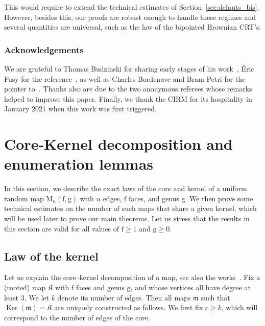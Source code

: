 \documentclass[JEP,XML,SOM,Unicode,NoFloatCountersInSection,NoEqCountersInSection]{cedram}
\theoremstyle{plain}
\theoremstyle{definition}
\theoremstyle{remark}
\newcommand{\map}{\mathfrak{m}}
\newcommand{\Map}{\mathrm{M}}
\newcommand{\face}{\mathrm{f}}
\newcommand{\gen}{\mathrm{g}}
\DeclareMathOperator{\Ker}{Ker}
\newcommand{\kernel}{\mathfrak{K}}
\begin{document}
This would require to extend the technical estimates of Section~\ref{sec:defauts_bis}. However, besides this, our proofs are robust enough to handle these regimes and several quantities are universal, such as the law of the bipointed Brownian CRT's.

\subsubsection*{Acknowledgements}
We are grateful to Thomas Budzinski for sharing early stages of his work~\cite{Bud21}, \'Eric Fusy for the reference~\cite{BCR93}, as well as Charles Bordenave and Bram Petri for the pointer to~\cite[Th.\,2.19]{Wor99}.
Thanks also are due to the two anonymous referees whose remarks helped to improve this paper.
Finally, we thank the CIRM for its hospitality in January 2021 when this work was first triggered.

\section{Core-Kernel decomposition and enumeration lemmas}
\label{sec:enumeration}

In this section, we describe the exact laws of the core and kernel of a uniform random map $ \Map_n(\face,\gen)$ with $n$ edges, $\face$ faces, and genus $\gen$. We then prove some technical estimates on the number of such maps that share a given kernel, which will be used later to prove our main theorems.
Let us stress that the results in this section are valid for
all values of $\face \ge 1$ and $\gen \ge 0$.

\subsection{Law of the kernel}
\label{sec:decomposition}

Let us explain
the core--kernel decomposition of a map, see also the works~\cite{CMS09,Cha10}. Fix a (rooted) map $\kernel$ with $\face$ faces and genus $\gen$, and whose vertices all have degree at least $3$. We let $k$ denote its number of edges. Then all maps $\map$ such that $ \Ker(\map) = \kernel$ are uniquely constructed as follows. We first fix $c \geq k$, which will correspond to the number of edges of the core.
\end{document}
